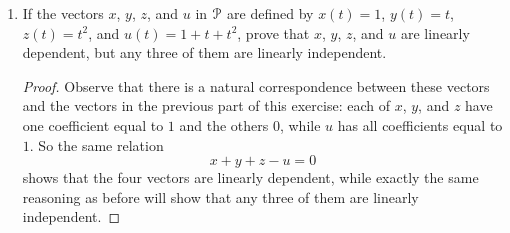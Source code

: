 \begin{enumerate}
\begin{proof}
    So let
    \begin{equation*}
      \alpha_1x + \alpha_2y + \alpha_3u = 0.
    \end{equation*}
    By equating the third coordinate of each side we get
    $\alpha_3 = 0$. Then from the first coordinates we get
    $\alpha_1 + \alpha_3 = 0$ so that $\alpha_1 = 0$. Similarly, from
    the second coordinates we get $\alpha_2 = 0$. Therefore
    $\alpha_1,\alpha_2,\alpha_3$ must all be zero, which establishes
    the linear independence of the three vectors, completing the
    proof.
  \end{proof}
\item If the vectors $x$, $y$, $z$, and $u$ in $\P$ are defined by
  $x(t) = 1$, $y(t) = t$, $z(t) = t^2$, and $u(t) = 1 + t + t^2$,
  prove that $x$, $y$, $z$, and $u$ are linearly dependent, but any
  three of them are linearly independent.
  \begin{proof}
    Observe that there is a natural correspondence between these
    vectors and the vectors in the previous part of this exercise:
    each of $x$, $y$, and $z$ have one coefficient equal to $1$ and
    the others $0$, while $u$ has all coefficients equal to $1$. So
    the same relation
    \begin{equation*}
      x + y + z - u = 0
    \end{equation*}
    shows that the four vectors are linearly dependent, while exactly
    the same reasoning as before will show that any three of them are
    linearly independent.
  \end{proof}
\end{enumerate}
